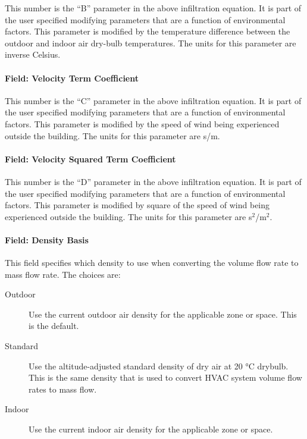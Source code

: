 This number is the ``B'' parameter in the above infiltration equation. It is part of the user specified modifying parameters that are a function of environmental factors. This parameter is modified by the temperature difference between the outdoor and indoor air dry-bulb temperatures. The units for this parameter are inverse Celsius.

\paragraph{Field: Velocity Term Coefficient}\label{field-velocity-term-coefficient}

This number is the ``C'' parameter in the above infiltration equation. It is part of the user specified modifying parameters that are a function of environmental factors. This parameter is modified by the speed of wind being experienced outside the building. The units for this parameter are s/m.

\paragraph{Field: Velocity Squared Term Coefficient}\label{field-velocity-squared-term-coefficient}

This number is the ``D'' parameter in the above infiltration equation. It is part of the user specified modifying parameters that are a function of environmental factors. This parameter is modified by square of the speed of wind being experienced outside the building. The units for this parameter are s\(^{2}\)/m\(^{2}\).

\paragraph{Field: Density Basis}\label{field-density-basis}

This field specifies which density to use when converting the volume flow rate to mass flow rate. The choices are:

\begin{description}

\item[Outdoor] Use the current outdoor air density for the applicable zone or space. This is the default.

\item[Standard] Use the altitude-adjusted standard density of dry air at 20 °C drybulb. This is the same density that is used to convert HVAC system volume flow rates to mass flow.

\item[Indoor] Use the current indoor air density for the applicable zone or space.

\end{description}



